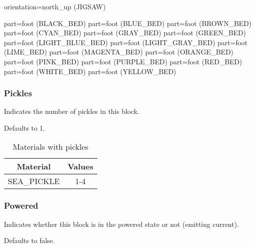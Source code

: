 orientation=north_up (JIGSAW)

part=foot (BLACK_BED)
part=foot (BLUE_BED)
part=foot (BROWN_BED)
part=foot (CYAN_BED)
part=foot (GRAY_BED)
part=foot (GREEN_BED)
part=foot (LIGHT_BLUE_BED)
part=foot (LIGHT_GRAY_BED)
part=foot (LIME_BED)
part=foot (MAGENTA_BED)
part=foot (ORANGE_BED)
part=foot (PINK_BED)
part=foot (PURPLE_BED)
part=foot (RED_BED)
part=foot (WHITE_BED)
part=foot (YELLOW_BED)

\subsubsection{Pickles}
Indicates the number of pickles in this block.

Defaults to 1.

\begin{table}[H]
	\centering
	\begin{tabular}{ |c|c| }
		\hline
		Material & Values \\
		\hline
		SEA\_PICKLE & 1-4 \\
		\hline
	\end{tabular}
	\caption{Materials with pickles}
\end{table}


\subsubsection{Powered}
Indicates whether this block is in the powered state or not (emitting current).

Defaults to false.

